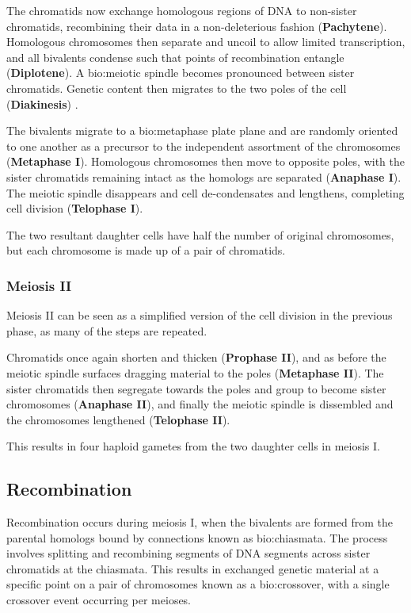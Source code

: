 The chromatids now exchange homologous regions of DNA to non-sister chromatids, recombining their data in a non-deleterious fashion (\textbf{Pachytene}).  Homologous chromosomes then separate and uncoil to allow limited transcription, and all bivalents condense such that points of recombination entangle (\textbf{Diplotene}). A \gls{bio:meiotic spindle} becomes pronounced between sister chromatids. Genetic content then migrates to the two poles of the cell (\textbf{Diakinesis}) .

The bivalents migrate to a \gls{bio:metaphase plate} plane and are randomly oriented to one another as a precursor to the independent assortment of the chromosomes (\textbf{Metaphase I}). Homologous chromosomes then move to opposite poles, with the sister chromatids remaining intact as the homologs are separated (\textbf{Anaphase I}).  The meiotic spindle disappears and cell de-condensates and lengthens, completing cell division (\textbf{Telophase I}). 

The two resultant daughter cells have half the number of original chromosomes, but each chromosome is made up of a pair of chromatids.


\subsubsection{Meiosis II}

Meiosis II can be seen as a simplified version of the cell division in the previous phase, as many of the steps are repeated.

Chromatids once again shorten and thicken (\textbf{Prophase II}), and as before the meiotic spindle surfaces dragging material to the poles (\textbf{Metaphase II}). The sister chromatids then segregate towards the poles and group to become sister chromosomes (\textbf{Anaphase II}), and finally the meiotic spindle is dissembled and the chromosomes lengthened (\textbf{Telophase II}).

This results in four haploid gametes from the two daughter cells in meiosis I. 

\subsection{Recombination}


Recombination occurs during meiosis I, when the bivalents are formed from the parental homologs bound by connections known as \gls{bio:chiasmata}.  The process involves splitting and recombining segments of DNA segments across sister chromatids at the chiasmata. This results in exchanged genetic material at a specific point on a pair of chromosomes known as a \gls{bio:crossover}, with a single crossover event occurring per meioses.

